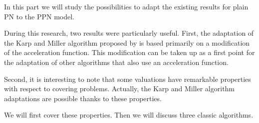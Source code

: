 In this part we will study the possibilities to adapt the existing results for plain \ac{PN} to the \ac{PPN} model.

During this research, two results were particularly useful.
First, the adaptation of the Karp and Miller algorithm proposed by \cite{David17} is based primarily on a modification of the acceleration function. This modification can be taken up as a first point for the adaptation of other algorithms that also use an acceleration function. %

Second, it is interesting to note that some valuations have remarkable properties with respect to covering problems.
Actually, the Karp and Miller algorithm adaptations are possible thanks to these properties.

We will first cover these properties.
Then we will discuss three classic algorithms.

